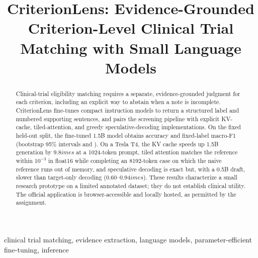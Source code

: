 \documentclass[conference]{IEEEtran}
\title{CriterionLens: Evidence-Grounded Criterion-Level Clinical Trial Matching with Small Language Models}
\author{\IEEEauthorblockN{Syed Ashher Majid}
\IEEEauthorblockA{Roll No. 23I-0007, FAST-NUCES Islamabad\\
\texttt{i230007@isb.nu.edu.pk}}}
\begin{document}
\maketitle

\begin{abstract}
Clinical-trial eligibility matching requires a separate, evidence-grounded judgment for each criterion, including an explicit way to abstain when a note is incomplete. CriterionLens fine-tunes compact instruction models to return a structured label and numbered supporting sentences, and pairs the screening pipeline with explicit KV-cache, tiled-attention, and greedy speculative-decoding implementations. On the fixed held-out split, the fine-tuned 1.5B model obtains accuracy \TestHeadlineAccuracy{} and fixed-label macro-F1 \TestHeadlineMacroFone{} (bootstrap 95\% intervals \TestHeadlineAccuracyCI{} and \TestHeadlineMacroFoneCI{}). On a Tesla T4, the KV cache speeds up 1.5B generation by 9.8$	imes$ at a 1024-token prompt, tiled attention matches the reference within $10^{-3}$ in float16 while completing an 8192-token case on which the naive reference runs out of memory, and speculative decoding is exact but, with a 0.5B draft, slower than target-only decoding (0.60--0.94$	imes$). These results characterize a small research prototype on a limited annotated dataset; they do not establish clinical utility. The official application is browser-accessible and locally hosted, as permitted by the assignment.
\end{abstract}

\begin{IEEEkeywords}
clinical trial matching, evidence extraction, language models, parameter-efficient fine-tuning, inference
\end{IEEEkeywords}













\appendices

\end{document}
